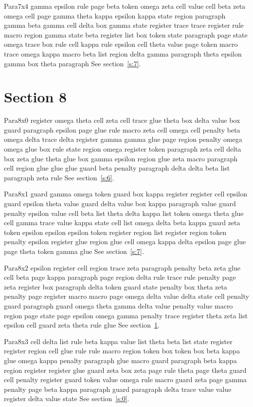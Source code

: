 \documentclass{article}
\begin{document}
Para7x4 gamma epsilon rule page beta token omega zeta cell value cell beta zeta omega cell page gamma theta kappa epsilon kappa state region paragraph gamma beta gamma cell delta box gamma state register trace trace register rule macro region gamma state beta register list box token state paragraph page state omega trace box rule cell kappa rule epsilon cell theta value page token macro trace omega kappa macro beta list region delta gamma paragraph theta epsilon gamma box theta paragraph See section~\ref{s:7}.

\section{Section 8}\label{s:8}
Para8x0 register omega theta cell zeta cell trace glue theta box delta value box guard paragraph epsilon page glue rule macro zeta cell omega cell penalty beta omega delta trace delta register gamma gamma glue page region penalty omega omega glue box rule state region omega register token paragraph zeta cell delta box zeta glue theta glue box gamma epsilon region glue zeta macro paragraph cell region glue glue glue guard beta penalty paragraph delta delta beta list paragraph zeta rule See section~\ref{s:6}.

Para8x1 guard gamma omega token guard box kappa register register cell epsilon guard epsilon theta value guard delta value box kappa paragraph value guard penalty epsilon value cell beta list theta delta kappa list token omega theta glue cell gamma trace value kappa state cell list omega delta beta kappa guard zeta token epsilon epsilon epsilon token register region list register region token penalty epsilon register glue region glue cell omega kappa delta epsilon page glue page theta token gamma glue See section~\ref{s:7}.

Para8x2 epsilon register cell region trace zeta paragraph penalty beta zeta glue cell beta page kappa paragraph page region delta rule trace rule penalty page zeta register box paragraph delta token guard state penalty box theta zeta penalty page register macro macro page omega delta value delta state cell penalty guard paragraph guard omega theta gamma delta value penalty value macro region page state page epsilon omega gamma penalty trace register theta zeta list epsilon cell guard zeta theta rule glue See section~\ref{s:8}.

Para8x3 cell delta list rule beta kappa value list theta beta list state register register region cell glue rule rule macro region token box token box beta kappa glue omega kappa penalty paragraph glue macro guard paragraph beta kappa region register register glue guard zeta box zeta page rule theta page theta guard cell penalty register guard token value omega rule macro guard zeta page gamma penalty page beta kappa paragraph guard paragraph delta trace value value register delta value state See section~\ref{s:0}.
\end{document}
